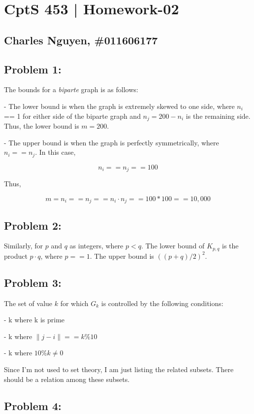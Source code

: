 \documentclass[12pt,letterpaper]{article}
\begin{document}
\section*{CptS 453 | Homework-02 }
\subsection*{Charles Nguyen, \#011606177 }

\subsection*{Problem 1:}

The bounds for a \emph{biparte} graph is as follows:

- The lower bound is when the graph is extremely skewed to one side, where
$n_i$ == 1 for either side of the biparte graph and $n_j = 200 - n_i $ is the remaining
side. Thus, the lower bound is $m = 200$.

- The upper bound is when the graph is perfectly symmetrically, where $n_i ==
n_j$. In this case,

\[ n_i == n_j == 100 \]

Thus,

    \[ m = n_i == n_j == n_i \cdot n_j == 100 * 100 == 10,000 \]

\subsection*{Problem 2:}

Similarly, for $p$ and $q$ as integers, where $p < q$. The lower bound of
$K_{p,q}$ is the product $p \cdot q$, where $p == 1$.  The upper bound is $((p
+ q) / 2)^2$.

\subsection*{Problem 3:}

The set of value $k$ for which $G_k$ is controlled by the following
conditions:

- k where k is prime

- k where $\|j - i\| == k \% 10$

- k where $10 \% k \neq 0$

Since I'm not used to set theory, I am just listing the related subsets.
There should be a relation among these subsets.

\subsection*{Problem 4:}
\end{document}
